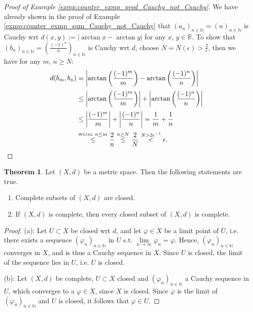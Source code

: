 \documentclass[12pt, a4paper]{article}
\numberwithin{equation}{section}
\theoremstyle{definition}
\theoremstyle{definition}
\newtheorem{theorem}[thm]{Theorem}
\newcommand{\abs}[1]{\left\vert #1 \right\vert}
\newcommand{\seq}[1][\varphi]{\left( #1 \right)_{n \in \mathbb{N}}}
\begin{document}
	\begin{proof}[Proof of Example \ref{exmp:counter_exmp_prod_Cauchy_not_Cauchy}]
		We have already shown in the proof of Example \ref{exmp:counter_exmp_sum_Cauchy_not_Cauchy} that $\seq[a_n] = \seq[n]$ is Cauchy wrt $d(x, y) := \abs{\arctan x - \arctan y}$ for any $x$, $y\in\mathbb R$. To show that $\seq[b_n] = \seq[\frac{(-1)^n}{n}]$ is Cauchy wrt $d$, choose $N = N(\epsilon) > \frac{2}{\epsilon}$, then we have for any $m$, $n\geq N$:
		\begin{align*}
			d(b_m, b_n) &= \abs{\arctan\left(\frac{(-1)^m}{m}\right) - \arctan \left(\frac{(-1)^n}{n}\right)} 
			\\[2pt] &\leq \abs{\arctan\left(\frac{(-1)^m}{m}\right)} + \abs{\arctan\left(\frac{(-1)^n}{n}\right)} 
			\\[2pt] &\leq \abs{\frac{(-1)^m}{m}} + \abs{\frac{(-1)^n}{n}} = \frac{1}{m} + \frac{1}{n} \\[2pt] &\overset{\text{\tiny WLOG}\ n \leq m}{\leq} \frac{2}{n} \overset{n \geq N}{\leq} \frac{2}{N} \overset{N > 2\epsilon^{-1}}{<} \epsilon.
		\end{align*}
	\end{proof} 
	
	\begin{theorem}\label{thrm:complete_subsets_properties}
		Let $(X, d)$ be a metric space. Then the following statements are true.
		\begin{enumerate}[label=(\alph*)]
			\item Complete subsets of $(X, d)$ are closed. \vspace{-0.3cm}
			\item If $(X, d)$ is complete, then every closed subset of $(X, d)$ is complete.
		\end{enumerate}
	\end{theorem}

	\begin{proof}
		(a): Let $U\subset X$ be closed wrt $d$, and let $\varphi\in X$ be a limit point of $\overline{U}$, i.e. there exists a sequence $\left(\varphi_{n}\right)_{n\in\mathbb N}$ in $U$ s.t. $\lim\limits_{n\to\infty}\varphi_n = \varphi$. Hence, $\left(\varphi_{n}\right)_{n\in\mathbb N}$ converges in $X$, and is thus a Cauchy sequence in $X$. Since $U$ is closed, the limit of the sequence lies in $U$, i.e. $U$ is closed.
		
		(b): Let $(X, d)$ be complete, $U\subset X$ closed and $(\varphi_n)_{n\in\mathbb N}$ a Cauchy sequence in $U$, which converges to a $\varphi\in X$, since $X$ is closed. Since $\varphi$ is the limit of $(\varphi_n)_{n\in\mathbb N}$ and $U$ is closed, it follows that $\varphi\in U$.
	\end{proof}
\end{document}
